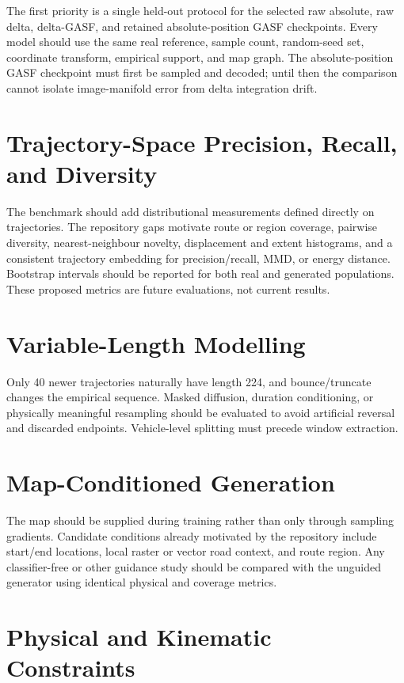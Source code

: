 \documentclass[12pt,a4paper,oneside]{report}
\begin{document}
The first priority is a single held-out protocol for the selected raw absolute, raw delta, delta-GASF, and retained absolute-position GASF checkpoints. Every model should use the same real reference, sample count, random-seed set, coordinate transform, empirical support, and map graph. The absolute-position GASF checkpoint must first be sampled and decoded; until then the comparison cannot isolate image-manifold error from delta integration drift.

\section{Trajectory-Space Precision, Recall, and Diversity}

The benchmark should add distributional measurements defined directly on trajectories. The repository gaps motivate route or region coverage, pairwise diversity, nearest-neighbour novelty, displacement and extent histograms, and a consistent trajectory embedding for precision/recall, MMD, or energy distance. Bootstrap intervals should be reported for both real and generated populations. These proposed metrics are future evaluations, not current results.

\section{Variable-Length Modelling}

Only 40 newer trajectories naturally have length 224, and bounce/truncate changes the empirical sequence. Masked diffusion, duration conditioning, or physically meaningful resampling should be evaluated to avoid artificial reversal and discarded endpoints. Vehicle-level splitting must precede window extraction.

\section{Map-Conditioned Generation}

The map should be supplied during training rather than only through sampling gradients. Candidate conditions already motivated by the repository include start/end locations, local raster or vector road context, and route region. Any classifier-free or other guidance study should be compared with the unguided generator using identical physical and coverage metrics.

\section{Physical and Kinematic Constraints}
\end{document}
